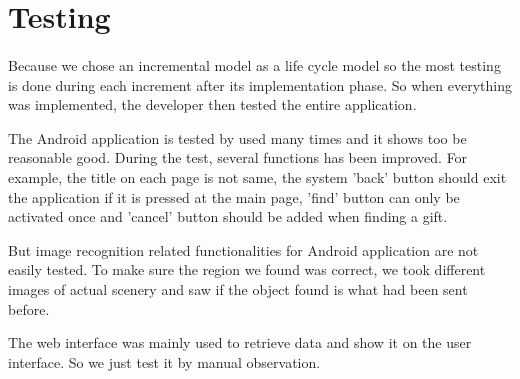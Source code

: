 \section{Testing}												
\label{sec:Testing}
\paragraph{} Because we chose an incremental model as a life cycle model so the most testing is done during each increment after its implementation phase. So when everything was implemented, the developer then tested the entire application.
\par The Android application is tested by used many times and it shows too be reasonable good. During the test, several functions has been improved. For example, the title on each page is not same, the system 'back' button should exit the application if it is pressed at the main page, 'find' button can only be activated once and 'cancel' button should be added when finding a gift.  
\par But image recognition related functionalities for Android application are not easily tested. To make sure the region we found was correct, we took different images of actual scenery and saw if the object found is what had been sent before. 
\par The web interface was mainly used to retrieve data and show it on the user interface. So we just test it by manual observation. 



